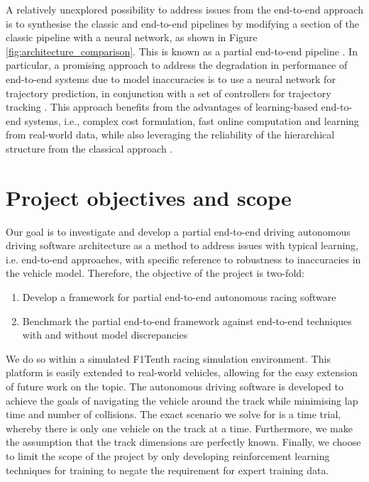 A relatively unexplored possibility to address issues from the end-to-end approach is to synthesise the classic and end-to-end pipelines by modifying a section of the classic pipeline with a neural network, as shown in Figure \ref{fig:architecture_comparison}. 
This is known as a partial end-to-end pipeline \cite{Betz2021}. 
In particular, a promising approach to address the degradation in performance of end-to-end systems due to model inaccuracies is to use a neural network for trajectory prediction, in conjunction with a set of controllers for trajectory tracking \cite{Capo2020}.
This approach benefits from the advantages of learning-based end-to-end systems, i.e., complex cost formulation, fast online computation and learning from real-world data, while also leveraging the reliability of the hierarchical structure from the classical approach \cite{Ghignone2022}. 


\section{Project objectives and scope}
\label{sec:objectives}

Our goal is to investigate and develop a partial end-to-end driving autonomous driving software architecture as a method to address issues with typical learning, i.e. end-to-end approaches, with specific reference to robustness to inaccuracies in the vehicle model. Therefore, the objective of the project is two-fold:

\begin{enumerate}
  \item Develop a framework for partial end-to-end autonomous racing software
  \item Benchmark the partial end-to-end framework against end-to-end techniques with and without model discrepancies
\end{enumerate}

We do so within a simulated F1Tenth racing simulation environment. 
This platform is easily extended to real-world vehicles, allowing for the easy extension of future work on the topic.
The autonomous driving software is developed to achieve the goals of navigating the vehicle around the track while minimising lap time and number of collisions. 
The exact scenario we solve for is a time trial, whereby there is only one vehicle on the track at a time. Furthermore, we make the assumption that the track dimensions are perfectly known. 
Finally, we choose to limit the scope of the project by only developing reinforcement learning techniques for training to negate the requirement for expert training data.


